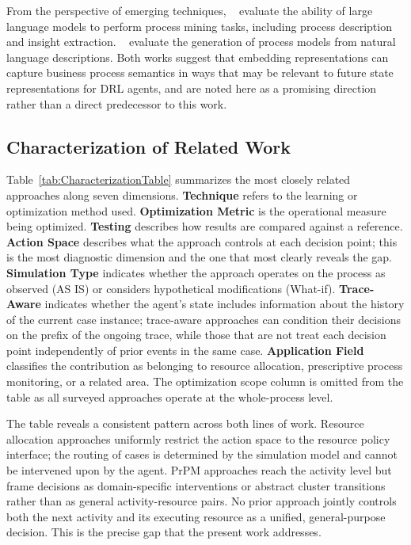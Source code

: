 \documentclass[journal,onecolumn]{IEEEtran}
\begin{document}
From the perspective of emerging techniques,
\citeauthor{PM_LLM_Benchmark}~\cite{PM_LLM_Benchmark} evaluate the
ability of large language models to perform process mining tasks,
including process description and insight extraction.
\citeauthor{business_process_modeling_llms}~\cite{business_process_modeling_llms}
evaluate the generation of process models from natural language
descriptions. Both works suggest that embedding representations can
capture business process semantics in ways that may be relevant to
future state representations for DRL agents, and are noted here as
a promising direction rather than a direct predecessor to this work.

\subsection{Characterization of Related Work}
\label{subsec:soa_characterization}

Table~\ref{tab:CharacterizationTable} summarizes the most closely
related approaches along seven dimensions. \textbf{Technique} refers
to the learning or optimization method used. \textbf{Optimization
Metric} is the operational measure being optimized. \textbf{Testing}
describes how results are compared against a reference. \textbf{Action
Space} describes what the approach controls at each decision point;
this is the most diagnostic dimension and the one that most clearly
reveals the gap. \textbf{Simulation Type} indicates whether the
approach operates on the process as observed (AS IS) or considers
hypothetical modifications (What-if). \textbf{Trace-Aware} indicates
whether the agent's state includes information about the history of
the current case instance; trace-aware approaches can condition their
decisions on the prefix of the ongoing trace, while those that are
not treat each decision point independently of prior events in the
same case. \textbf{Application Field} classifies the contribution
as belonging to resource allocation, prescriptive process monitoring,
or a related area. The optimization scope column is omitted from the
table as all surveyed approaches operate at the whole-process level.

The table reveals a consistent pattern across both lines of work.
Resource allocation approaches uniformly restrict the action space
to the resource policy interface; the routing of cases is determined
by the simulation model and cannot be intervened upon by the agent.
PrPM approaches reach the activity level but frame decisions as
domain-specific interventions or abstract cluster transitions rather
than as general activity-resource pairs. No prior approach jointly
controls both the next activity and its executing resource as a
unified, general-purpose decision. This is the precise gap that the
present work addresses.
\end{document}
